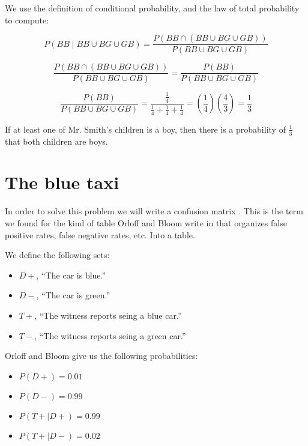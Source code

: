 \documentclass[a4paper,11pt]{article}
\begin{document}
We use the definition of conditional probability, and the law of total
probability to compute:

\begin{equation}
P \left( BB \mid BB \cup BG \cup GB \right) 
= \frac{ P \left( BB \cap \left( BB \cup BG \cup GB \right) \right) }
  { P \left( BB \cup BG \cup GB \right) }
\end{equation}

\begin{equation}
\frac{ P \left( BB \cap \left( BB \cup BG \cup GB \right) \right) }
  { P \left( BB \cup BG \cup GB \right) }
= \frac{ P \left( BB \right)}
  { P \left( BB \cup BG \cup GB \right) }
\end{equation}

\begin{equation}
 \frac{ P \left( BB \right)}
  { P \left( BB \cup BG \cup GB \right) }
= \frac{ \frac{ 1}{4} }
  { \frac{1}{4} + \frac{1}{4} + \frac{1}{4}}
= \left( \frac{1}{4} \right) \left( \frac{4}{3} \right)
= \frac{1}{3}
\end{equation}

If at least one of Mr. Smith's children is a boy, then there is a 
probability of $\frac{1}{3}$ that both children are boys.

\section{The blue taxi}

In order to solve this problem we will write a confusion matrix
\cite{confusionMatrix}.  This is the term we found for the kind of 
table Orloff and Bloom write in \cite{reading3} that organizes false
positive rates, false negative rates, etc. Into a table.

We define the following sets:
  \begin{itemize}
  \item $D+$, ``The car is blue.''
  \item $D-$, ``The car is green.''
  \item $T+$, ``The witness reports seing a blue car.''
  \item $T-$, ``The witness reports seing a green car.''
\end{itemize}

Orloff and Bloom give us the following probabilities:

\begin{itemize}
  \item $P \left( D+ \right) = 0.01$
  \item $P \left( D- \right) = 0.99$
  \item $P \left( T+ \mid D+ \right) = 0.99$
  \item $P \left( T+ \mid D- \right) = 0.02$
\end{itemize}
\end{document}
